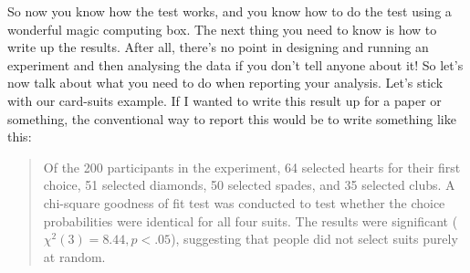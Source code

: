 
So now you know how the test works, and you know how to do the test using a wonderful magic computing box. The next thing you need to know is how to write up the results. After all, there's no point in designing and running an experiment and then analysing the data if you don't tell anyone about it! So let's now talk about what you need to do when reporting your analysis. Let's stick with our card-suits example. If I wanted to write this result up for a paper or something, the conventional way to report this would be to write something like this:

\begin{quote}
Of the 200 participants in the experiment, 64 selected hearts for their first choice, 51 selected diamonds, 50 selected spades, and 35 selected clubs. A chi-square goodness of fit test was conducted to test whether the choice probabilities were identical for all four suits. The results were significant ($\chi^2(3) = 8.44, p<.05$), suggesting that people did not select suits purely at random.
\end{quote}




